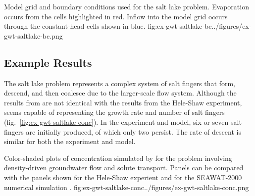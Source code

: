\begin{StandardFigure}{
                                     Model grid and boundary conditions used for the salt lake problem.  Evaporation occurs from the cells highlighted in red.  Inflow into the model grid occurs through the constant-head cells shown in blue.
                                     }{fig:ex-gwt-saltlake-bc}{../figures/ex-gwt-saltlake-bc.png}
\end{StandardFigure}                                 


\subsection{Example Results}

The salt lake problem represents a complex system of salt fingers that form, descend, and then coalesce due to the larger-scale flow system. Although the results from \mf are not identical with the results from the Hele-Shaw experiment, \mf seems capable of representing the growth rate and number of salt fingers (fig.~\ref{fig:ex-gwt-saltlake-conc}). In the experiment and model, six or seven salt fingers are initially produced, of which only two persist. The rate of descent is similar for both the experiment and model.  

\begin{StandardFigure}{
                                     Color-shaded plots of concentration simulated by \mf for the \cite{simmons1999} problem involving density-driven groundwater flow and solute transport.  Panels can be compared with the panels shown for the Hele-Shaw experient \citep{wooding1997b} and for the SEAWAT-2000 numerical simulation \citep{langevin2003seawat}.
                                     }{fig:ex-gwt-saltlake-conc}{../figures/ex-gwt-saltlake-conc.png}
\end{StandardFigure}                                 

                              
